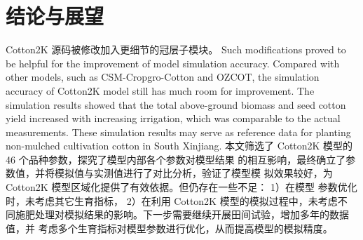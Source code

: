 \chapter{结论与展望}

Cotton2K 源码被修改加入更细节的冠层子模块。
Such modifications proved to be helpful for the improvement of model simulation accuracy.
Compared with other models, such as CSM-Cropgro-Cotton and OZCOT, the simulation accuracy of Cotton2K model still has much room for improvement.
The simulation results showed that the total above-ground biomass and seed cotton yield increased with increasing irrigation, which was comparable to the actual measurements.
These simulation results may serve as reference data for planting non-mulched cultivation cotton in South Xinjiang.
本文筛选了 Cotton2K 模型的 46 个品种参数，探究了模型内部各个参数对模型结果
的相互影响，最终确立了参数值，并将模拟值与实测值进行了对比分析，验证了模型模
拟效果较好，为 Cotton2K 模型区域化提供了有效依据。但仍存在一些不足： 1）在模型
参数优化时，未考虑其它生育指标， 2）在利用 Cotton2K 模型的模拟过程中，未考虑不
同施肥处理对模拟结果的影响。下一步需要继续开展田间试验，增加多年的数据值，并
考虑多个生育指标对模型参数进行优化，从而提高模型的模拟精度。